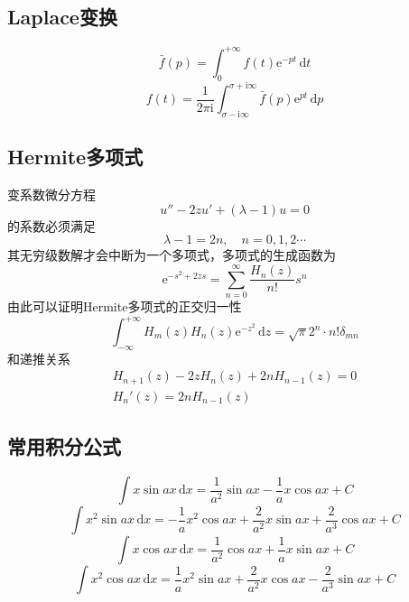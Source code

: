 \subsection{Laplace变换}
\begin{equation}\label{拉普拉斯变换}
    \bar{f}(p)=\int_{0}^{+\infty}f(t)\mathrm{e}^{-pt}\,\mathrm{d}t
\end{equation}
\begin{equation}\label{拉普拉斯逆变换}
    f(t)=\frac{1}{2\pi\mathrm{i}}\int_{\sigma-\mathrm{i}\infty}^{\sigma+\mathrm{i}\infty}\bar{f}(p)\mathrm{e}^{pt}\,\mathrm{d}p
\end{equation}


\subsection{Hermite多项式}
变系数微分方程
\begin{equation}
    u''-2zu'+(\lambda-1)u=0
\end{equation}
的系数必须满足
\begin{equation}\label{变系数微分方程有解的条件}
    \lambda-1=2n, \quad n=0,1,2\cdots
\end{equation}
其无穷级数解才会中断为一个多项式，多项式的生成函数为
\begin{equation}\label{hermite多项式的生成函数}
    \mathrm{e}^{-s^2+2zs}=\sum_{n=0}^{\infty}\frac{H_n(z)}{n!}s^n
\end{equation}
由此可以证明Hermite多项式的正交归一性
\begin{equation}\label{hermite多项式的正交归一性}
    \int_{-\infty}^{+\infty}H_m(z)H_n(z)\mathrm{e}^{-z^2}\,\mathrm{d}z=\sqrt{\pi}2^n\cdot n!\delta_{mn}
\end{equation}
和递推关系
\begin{gather}\label{hermite多项式的递推关系}
    H_{n+1}(z)-2zH_n(z)+2nH_{n-1}(z)=0  \\
    H_n'(z)=2nH_{n-1}(z)
\end{gather}

\subsection{常用积分公式}\label{常用积分公式}
\begin{equation}
    \int x\sin{ax} \,\mathrm{d}x = \frac{1}{a^2}\sin{ax}-\frac{1}{a}x\cos{ax}+C
\end{equation}
\begin{equation}
    \int x^2\sin{ax}\,\mathrm{d}x = -\frac{1}{a}x^2\cos{ax}+\frac{2}{a^2}x\sin{ax}+\frac{2}{a^3}\cos{ax}+C
\end{equation}
\begin{equation}
    \int x\cos{ax}\,\mathrm{d}x = \frac{1}{a^2}\cos{ax}+\frac{1}{a}x\sin{ax}+C
\end{equation}
\begin{equation}
    \int x^2\cos{ax}\,\mathrm{d}x = \frac{1}{a}x^2\sin{ax}+\frac{2}{a^2}x\cos{ax}-\frac{2}{a^3}\sin{ax}+C
\end{equation}




